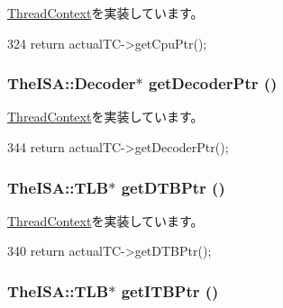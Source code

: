 \hyperlink{classThreadContext_ad10a7ef049c2d2ffadfc809341e66d4e}{ThreadContext}を実装しています。


\begin{DoxyCode}
324 { return actualTC->getCpuPtr(); }
\end{DoxyCode}
\hypertarget{classProxyThreadContext_a6ae33963bc5f8b515f0a50c483f21c7f}{
\subsubsection[{getDecoderPtr}]{\setlength{\rightskip}{0pt plus 5cm}TheISA::Decoder$\ast$ getDecoderPtr ()}}
\label{classProxyThreadContext_a6ae33963bc5f8b515f0a50c483f21c7f}


\hyperlink{classThreadContext_a14aa0e2adc88b9bc615f708aad02d80f}{ThreadContext}を実装しています。


\begin{DoxyCode}
344 { return actualTC->getDecoderPtr(); }
\end{DoxyCode}
\hypertarget{classProxyThreadContext_a2fe6a07c44bc2a4d83b86bea605ba971}{
\subsubsection[{getDTBPtr}]{\setlength{\rightskip}{0pt plus 5cm}TheISA::TLB$\ast$ getDTBPtr ()}}
\label{classProxyThreadContext_a2fe6a07c44bc2a4d83b86bea605ba971}


\hyperlink{classThreadContext_a235a0443e22590632cfc95cd4f6db1ae}{ThreadContext}を実装しています。


\begin{DoxyCode}
340 { return actualTC->getDTBPtr(); }
\end{DoxyCode}
\hypertarget{classProxyThreadContext_a95b7e95d0558cd03d69613142fff9137}{
\subsubsection[{getITBPtr}]{\setlength{\rightskip}{0pt plus 5cm}TheISA::TLB$\ast$ getITBPtr ()}}
\label{classProxyThreadContext_a95b7e95d0558cd03d69613142fff9137}


